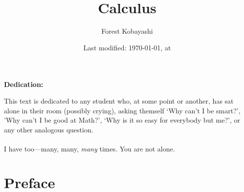 \documentclass[10pt]{article}
\theoremstyle{definition}
\begin{document}
\pagestyle{fancy}

\setlength{\headheight}{0pt}
\setlength\parindent{0pt}


\setlength{\headheight}{0pt}
\pretitle{\begin{center}\Huge\bfseries}
\posttitle{\par\end{center}\vskip 0.5em}
\preauthor{\begin{center}\Large\ttfamily}
\postauthor{\end{center}}
\predate{\par\large\centering}
\postdate{\par}

\title{Calculus}
\author{Forest Kobayashi}
\date{Last modified: \today, at \the\time}
\maketitle
\thispagestyle{empty}
\clearpage
\vspace{5cm}
\begin{center}
\Large\bfseries Dedication:
\end{center}
{\large%
This text is dedicated to any student who, at some point or another,
has sat alone in their room (possibly crying), asking themself `Why
can't I be smart?', 'Why can't I be good at Math?', `Why is it so easy
for everybody but me?', or any other analogous question.  \\~\\
I have too---many, many, \emph{many} times.  You are not alone. }%
\thispagestyle{empty}
\clearpage
\tableofcontents
\clearpage
\pagestyle{fancy}
\section{Preface}
\end{document}
